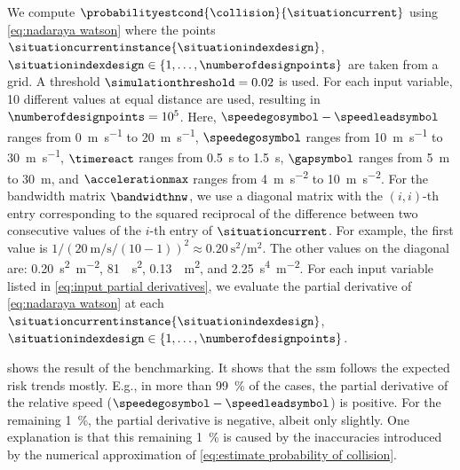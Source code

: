 We compute $\probabilityestcond{\collision}{\situationcurrent}$ using \cref{eq:nadaraya watson} where the points $\situationcurrentinstance{\situationindexdesign}$, $\situationindexdesign\in\{1,\ldots,\numberofdesignpoints\}$ are taken from a grid.
A threshold $\simulationthreshold=0.02$ is used.
For each input variable, 10 different values at equal distance are used, resulting in $\numberofdesignpoints=10^5$.
Here, $\speedegosymbol-\speedleadsymbol$ ranges from \SI{0}{\meter\per\second} to \SI{20}{\meter\per\second}, $\speedegosymbol$ ranges from \SI{10}{\meter\per\second} to \SI{30}{\meter\per\second}, $\timereact$ ranges from \SI{0.5}{\second} to \SI{1.5}{\second}, $\gapsymbol$ ranges from \SI{5}{\meter} to \SI{30}{\meter}, and $\accelerationmax$ ranges from \SI{4}{\meter\per\second\squared} to \SI{10}{\meter\per\second\squared}.
For the bandwidth matrix $\bandwidthnw$, we use a diagonal matrix with the $(i,i)$-th entry corresponding to the squared reciprocal of the difference between two consecutive values of the $i$-th entry of $\situationcurrent$.
For example, the first value is $1/(\SI{20}{\meter\per\second}/(10-1))^2 \approx \SI{0.20}{\second\squared\per\meter\squared}$. 
The other values on the diagonal are: \SI{0.20}{\second\squared\per\meter\squared}, \SI[per-mode=reciprocal]{81}{\per\second\squared}, \SI[per-mode=reciprocal]{0.13}{\per\meter\squared}, and \SI{2.25}{\second\tothe{4}\per\meter\squared}.
For each input variable listed in \cref{eq:input partial derivatives}, we evaluate the partial derivative of \cref{eq:nadaraya watson} at each $\situationcurrentinstance{\situationindexdesign}$, $\situationindexdesign\in\{1,\ldots,\numberofdesignpoints\}$.

 shows the result of the benchmarking. 
It shows that the \ac{ssm} follows the expected risk trends mostly. 
E.g., in more than \SI{99}{\%} of the cases, the partial derivative of the relative speed ($\speedegosymbol-\speedleadsymbol$) is positive.
For the remaining \SI{1}{\%}, the partial derivative is negative, albeit only slightly. 
One explanation is that this remaining \SI{1}{\percent} is caused by the inaccuracies introduced by the numerical approximation of \cref{eq:estimate probability of collision}.

